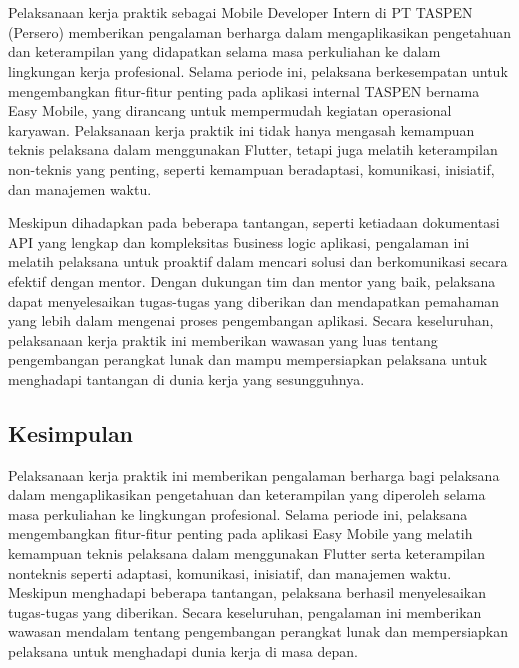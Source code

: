 \chapter{\babTiga}
\label{bab:3}
Pelaksanaan kerja praktik sebagai Mobile Developer Intern di PT TASPEN (Persero)
memberikan pengalaman berharga dalam mengaplikasikan pengetahuan dan keterampilan
yang didapatkan selama masa perkuliahan ke dalam lingkungan kerja profesional.
Selama periode ini, pelaksana berkesempatan untuk mengembangkan fitur-fitur
penting pada aplikasi internal TASPEN bernama Easy Mobile, yang dirancang untuk
mempermudah kegiatan operasional karyawan. Pelaksanaan kerja praktik ini tidak
hanya mengasah kemampuan teknis pelaksana dalam menggunakan Flutter, tetapi juga
melatih keterampilan non-teknis yang penting, seperti kemampuan beradaptasi,
komunikasi, inisiatif, dan manajemen waktu.

Meskipun dihadapkan pada beberapa tantangan, seperti ketiadaan dokumentasi API
yang lengkap dan kompleksitas \f{business logic} aplikasi, pengalaman ini melatih
pelaksana untuk proaktif dalam mencari solusi dan berkomunikasi secara efektif
dengan mentor. Dengan dukungan tim dan mentor yang baik, pelaksana dapat
menyelesaikan tugas-tugas yang diberikan dan mendapatkan pemahaman yang lebih
dalam mengenai proses pengembangan aplikasi. Secara keseluruhan, pelaksanaan
kerja praktik ini memberikan wawasan yang luas tentang pengembangan perangkat
lunak dan mampu mempersiapkan pelaksana untuk menghadapi tantangan di dunia kerja
yang sesungguhnya.



\section{Kesimpulan}
\label{sec:kesimpulan}
Pelaksanaan kerja praktik ini memberikan pengalaman berharga bagi pelaksana
dalam mengaplikasikan pengetahuan dan keterampilan yang diperoleh selama masa
perkuliahan ke lingkungan profesional. Selama periode ini, pelaksana
mengembangkan fitur-fitur penting pada aplikasi Easy Mobile yang melatih
kemampuan teknis pelaksana dalam menggunakan Flutter serta keterampilan
nonteknis seperti adaptasi, komunikasi, inisiatif, dan manajemen waktu.
Meskipun menghadapi beberapa tantangan, pelaksana berhasil menyelesaikan
tugas-tugas yang diberikan. Secara keseluruhan, pengalaman ini memberikan
wawasan mendalam tentang pengembangan perangkat lunak dan mempersiapkan
pelaksana untuk menghadapi dunia kerja di masa depan.



